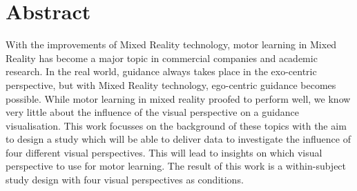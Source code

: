 \chapter*{Abstract}
With the improvements of Mixed Reality technology, motor learning in Mixed Reality has become a major topic in commercial companies and academic research. In the real world, guidance always takes place in the exo-centric perspective, but with Mixed Reality technology, ego-centric guidance becomes possible. While motor learning in mixed reality proofed to perform well, we know very little about the influence of the visual perspective on a guidance visualisation. This work focusses on the background of these topics with the aim to design a study which will be able to deliver data to investigate the influence of four different visual perspectives. This will lead to insights on which visual perspective to use for motor learning. The result of this work is a within-subject study design with four visual perspectives as conditions.
\thispagestyle{empty}